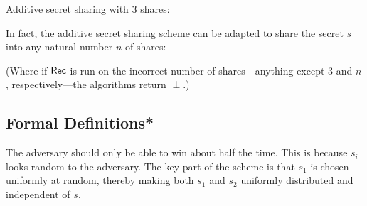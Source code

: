 \begin{answer} Additive secret sharing with 3 shares:
    \begin{pchstack}[center]
    \end{pchstack}

    In fact, the additive secret sharing scheme can be adapted to share 
    the secret $s$ into any natural number $n$ of shares:
    \begin{pchstack}[center]
    \end{pchstack}

    (Where if $\mathsf{Rec}$ is run on the incorrect number of shares---anything except 
    3 and $n$, respectively---the algorithms return $\perp$.)
\end{answer}

\subsection{Formal Definitions*}
\begin{sampleA}
    The adversary should only be able to win about half the time. This is 
    because $s_i$ looks random to the adversary. The key part of the scheme 
    is that $s_1$ is chosen uniformly at random, thereby making both $s_1$ 
    and $s_2$ uniformly distributed and independent of $s$.
\end{sampleA}

